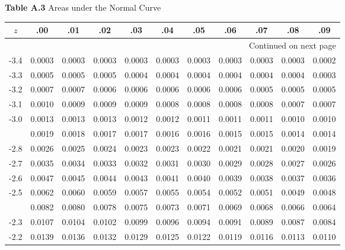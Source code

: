\documentclass[12pt,a4paper]{article}
\begin{document}
\begin{enumerate}
\vspace{0.3cm}
\noindent\textbf{Table A.3} Areas under the Normal Curve
\vspace{0.2cm}

\begin{center}
\small
\begin{longtable}{ccccccccccc}
\toprule\toprule
$z$ & .00 & .01 & .02 & .03 & .04 & .05 & .06 & .07 & .08 & .09 \\
\midrule
\endhead %

\midrule
\multicolumn{11}{r}{{Continued on next page}} \\
\bottomrule
\endfoot

\bottomrule\bottomrule
\endlastfoot

-3.4 & 0.0003 & 0.0003 & 0.0003 & 0.0003 & 0.0003 & 0.0003 & 0.0003 & 0.0003 & 0.0003 & 0.0002 \\
-3.3 & 0.0005 & 0.0005 & 0.0005 & 0.0004 & 0.0004 & 0.0004 & 0.0004 & 0.0004 & 0.0004 & 0.0003 \\
-3.2 & 0.0007 & 0.0007 & 0.0006 & 0.0006 & 0.0006 & 0.0006 & 0.0006 & 0.0005 & 0.0005 & 0.0005 \\
-3.1 & 0.0010 & 0.0009 & 0.0009 & 0.0009 & 0.0008 & 0.0008 & 0.0008 & 0.0008 & 0.0007 & 0.0007 \\
-3.0 & 0.0013 & 0.0013 & 0.0013 & 0.0012 & 0.0012 & 0.0011 & 0.0011 & 0.0011 & 0.0010 & 0.0010 \\
\addlinespace
-2.9 & 0.0019 & 0.0018 & 0.0017 & 0.0017 & 0.0016 & 0.0016 & 0.0015 & 0.0015 & 0.0014 & 0.0014 \\
-2.8 & 0.0026 & 0.0025 & 0.0024 & 0.0023 & 0.0023 & 0.0022 & 0.0021 & 0.0021 & 0.0020 & 0.0019 \\
-2.7 & 0.0035 & 0.0034 & 0.0033 & 0.0032 & 0.0031 & 0.0030 & 0.0029 & 0.0028 & 0.0027 & 0.0026 \\
-2.6 & 0.0047 & 0.0045 & 0.0044 & 0.0043 & 0.0041 & 0.0040 & 0.0039 & 0.0038 & 0.0037 & 0.0036 \\
-2.5 & 0.0062 & 0.0060 & 0.0059 & 0.0057 & 0.0055 & 0.0054 & 0.0052 & 0.0051 & 0.0049 & 0.0048 \\
\addlinespace
-2.4 & 0.0082 & 0.0080 & 0.0078 & 0.0075 & 0.0073 & 0.0071 & 0.0069 & 0.0068 & 0.0066 & 0.0064 \\
-2.3 & 0.0107 & 0.0104 & 0.0102 & 0.0099 & 0.0096 & 0.0094 & 0.0091 & 0.0089 & 0.0087 & 0.0084 \\
-2.2 & 0.0139 & 0.0136 & 0.0132 & 0.0129 & 0.0125 & 0.0122 & 0.0119 & 0.0116 & 0.0113 & 0.0110 \\

\end{longtable}
\end{center}
\end{enumerate}
\end{document}
